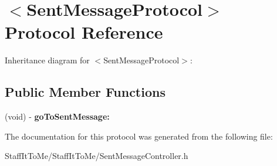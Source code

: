 \hypertarget{protocol_sent_message_protocol-p}{
\section{$<$\-Sent\-Message\-Protocol$>$ \-Protocol \-Reference}
\label{protocol_sent_message_protocol-p}
}


\-Inheritance diagram for $<$\-Sent\-Message\-Protocol$>$\-:
\subsection*{\-Public \-Member \-Functions}
\begin{DoxyCompactItemize}
\item 
\hypertarget{protocol_sent_message_protocol-p_a562f69bf228c96f0457da7708eb6df01}{
(void) -\/ {\bfseries go\-To\-Sent\-Message\-:}}
\label{protocol_sent_message_protocol-p_a562f69bf228c96f0457da7708eb6df01}

\end{DoxyCompactItemize}


\-The documentation for this protocol was generated from the following file\-:\begin{DoxyCompactItemize}
\item 
\-Staff\-It\-To\-Me/\-Staff\-It\-To\-Me/\-Sent\-Message\-Controller.\-h\end{DoxyCompactItemize}
